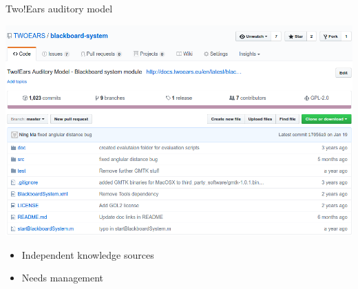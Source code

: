 \documentclass{beamer}
\begin{document}
\begin{frame}{Two!Ears auditory model}
\begin{minipage}[b]{0.56\columnwidth}
        \centering
        \includegraphics[width=.9\textwidth]{fig/blackboard-system}

        \begin{itemize}
            \item Independent knowledge sources
            \item Needs management
        \end{itemize}

    \end{minipage}

\end{frame}
\end{document}
